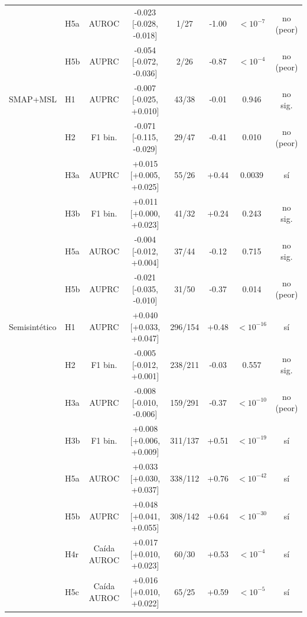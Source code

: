 \begin{table}[t]
\begin{tabular}{llcccccc}
 & H5a & AUROC & -0.023 [-0.028, -0.018] & 1/27 & -1.00 & $<10^{-7}$ & no (peor) \\
 & H5b & AUPRC & -0.054 [-0.072, -0.036] & 2/26 & -0.87 & $<10^{-4}$ & no (peor) \\
\midrule
SMAP+MSL & H1 & AUPRC & -0.007 [-0.025, +0.010] & 43/38 & -0.01 & 0.946 & no sig. \\
 & H2 & F1 bin. & -0.071 [-0.115, -0.029] & 29/47 & -0.41 & 0.010 & no (peor) \\
 & H3a & AUPRC & +0.015 [+0.005, +0.025] & 55/26 & +0.44 & 0.0039 & sí \\
 & H3b & F1 bin. & +0.011 [+0.000, +0.023] & 41/32 & +0.24 & 0.243 & no sig. \\
 & H5a & AUROC & -0.004 [-0.012, +0.004] & 37/44 & -0.12 & 0.715 & no sig. \\
 & H5b & AUPRC & -0.021 [-0.035, -0.010] & 31/50 & -0.37 & 0.014 & no (peor) \\
\midrule
Semisintético & H1 & AUPRC & +0.040 [+0.033, +0.047] & 296/154 & +0.48 & $<10^{-16}$ & sí \\
 & H2 & F1 bin. & -0.005 [-0.012, +0.001] & 238/211 & -0.03 & 0.557 & no sig. \\
 & H3a & AUPRC & -0.008 [-0.010, -0.006] & 159/291 & -0.37 & $<10^{-10}$ & no (peor) \\
 & H3b & F1 bin. & +0.008 [+0.006, +0.009] & 311/137 & +0.51 & $<10^{-19}$ & sí \\
 & H5a & AUROC & +0.033 [+0.030, +0.037] & 338/112 & +0.76 & $<10^{-42}$ & sí \\
 & H5b & AUPRC & +0.048 [+0.041, +0.055] & 308/142 & +0.64 & $<10^{-30}$ & sí \\
 & H4r & Caída AUROC & +0.017 [+0.010, +0.023] & 60/30 & +0.53 & $<10^{-4}$ & sí \\
 & H5c & Caída AUROC & +0.016 [+0.010, +0.022] & 65/25 & +0.59 & $<10^{-5}$ & sí \\
\bottomrule
\end{tabular}
\end{table}

